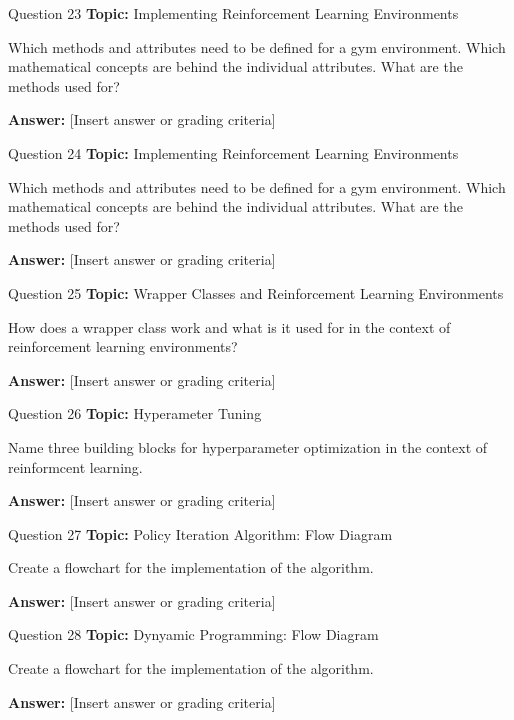 \begin{frame}{Question 23}
    \textbf{Topic:} Implementing Reinforcement Learning Environments
    
    \vspace{10pt}
    Which methods and attributes need to be defined for a gym environment. Which mathematical concepts are behind the individual attributes. What are the methods used for? 
    \vspace{20pt}

    \textbf{Answer:} [Insert answer or grading criteria]
\end{frame}

\begin{frame}{Question 24}
    \textbf{Topic:} Implementing Reinforcement Learning Environments

    \vspace{10pt}
    Which methods and attributes need to be defined for a gym environment. Which mathematical concepts are behind the individual attributes. What are the methods used for? 
    \vspace{20pt}

    \textbf{Answer:} [Insert answer or grading criteria]
\end{frame}

\begin{frame}{Question 25}
    \textbf{Topic:} Wrapper Classes and Reinforcement Learning Environments

    \vspace{10pt}
    How does a wrapper class work and what is it used for in the context of reinforcement learning environments?   
    \vspace{20pt}

    \textbf{Answer:} [Insert answer or grading criteria]
\end{frame}

\begin{frame}{Question 26}
    \textbf{Topic:} Hyperameter Tuning

    \vspace{10pt}
    Name three building blocks for hyperparameter optimization in the context of reinformcent learning.  
    \vspace{20pt}

    \textbf{Answer:} [Insert answer or grading criteria]
\end{frame}
\begin{frame}{Question 27}
    \textbf{Topic:} Policy Iteration Algorithm: Flow Diagram

    \vspace{10pt}
    Create a flowchart for the implementation of the algorithm. 
    \vspace{20pt}

    \textbf{Answer:} [Insert answer or grading criteria]
\end{frame}

\begin{frame}{Question 28}
    \textbf{Topic:} Dynyamic Programming: Flow Diagram

    \vspace{10pt}
    Create a flowchart for the implementation of the algorithm. 
    \vspace{20pt}

    \textbf{Answer:} [Insert answer or grading criteria]
\end{frame}

